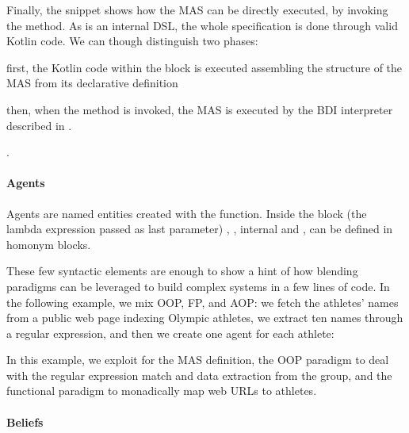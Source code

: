 Finally, the snippet shows how the \ac{MAS} can be directly executed, by invoking the  method.
%
As \jakta{} is an internal \ac{DSL}, the whole specification is done through valid Kotlin code.
%
We can though distinguish two phases:
\begin{inlinelist}
    \item first, the Kotlin code within the  block is executed
        assembling the structure of the \ac{MAS} from its declarative definition
    \item then, when the  method is invoked, the MAS is executed by the BDI interpreter described in .
\end{inlinelist}.
%

\paragraph{Agents}

Agents are named entities created with the  function. %
%
Inside the  block
(the lambda expression passed as last parameter)
, , internal  and ,
can be defined in homonym blocks.

These few syntactic elements are enough to show a hint of how blending paradigms can be leveraged to build complex systems in a few lines of code.
%
In the following example, we mix \ac{OOP}, \ac{FP}, and \ac{AOP}:
we fetch the athletes' names from a public web page indexing Olympic athletes,
we extract ten names through a regular expression,
and then we create one agent for each athlete:

%
In this example, we exploit \jakta{} for the \ac{MAS} definition,
the \ac{OOP} paradigm to deal with the regular expression match and data extraction from the group,
and the functional paradigm to monadically map web URLs to athletes.

\paragraph{Beliefs}

